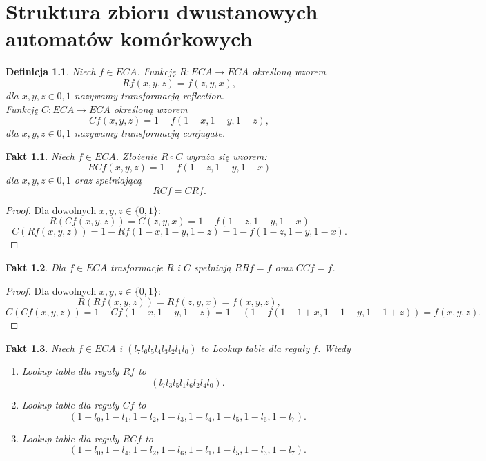 \documentclass{xmgr}
\newtheorem{definition}{Definicja}
\newtheorem{fact}{Fakt}
\begin{document}
\chapter{Struktura zbioru dwustanowych automatów komórkowych}


\begin{definition}
 Niech $f \in ECA$. Funkcję $R : ECA \rightarrow ECA$ określoną wzorem
 \[
  Rf(x,y,z) = f(z,y,x),
 \]
 dla $x,y,z \in {0,1}$ nazywamy transformacją reflection.
 \\Funkcję $C : ECA \rightarrow ECA$ określoną wzorem
 \[
  Cf(x,y,z) = 1 - f(1-x,1-y,1-z),
 \]
 dla $x,y,z \in {0,1}$ nazywamy transformacją conjugate.
\end{definition}

\begin{fact}
 Niech $f \in ECA$. Złożenie $R\circ C$ wyraża się wzorem:
 \[
  RC f (x,y,z) = 1 - f(1-z, 1-y, 1-x)
 \]
dla $x,y,z \in {0,1}$ oraz spełniającą
\[
 RCf = CRf.
\]
\end{fact}

\begin{proof}
 Dla dowolnych $x,y,z \in \{0,1\}$:
 \[
  R(Cf(x,y,z)) = C(z,y,x) = 1 - f(1-z,1-y,1-x)
 \]
\[
 C(Rf(x,y,z)) = 1 - Rf(1-x, 1-y, 1-z) = 1 - f(1-z, 1-y, 1-x).
\]

\end{proof}

\begin{fact}
Dla $f \in ECA$ trasformacje $R$ i $C$ spełniają $RRf = f$ oraz $CCf = f$.
\end{fact}

\begin{proof}
 Dla dowolnych $x,y,z \in \{0,1\}$:
 \[
  R(Rf(x,y,z)) = Rf(z,y,x) = f(x,y,z),
 \]
 \[
  C(Cf(x,y,z)) = 1 - Cf(1-x,1-y,1-z) = 1 - (1 - f(1 - 1+x, 1 - 1+y, 1 - 1+z)) = f(x,y,z).
 \]

\end{proof}


\begin{fact}
 Niech $f \in ECA$ i $(l_{7}l_{6}l_{5}l_{4}l_{3}l_{2}l_{1}l_{0})$ to Lookup table dla reguły $f$. Wtedy
 \begin{enumerate}
  \item Lookup table dla reguły $Rf$ to 
  \[
   (l_{7}l_{3}l_{5}l_{1}l_{6}l_{2}l_{4}l_{0}).
  \]
  \item Lookup table dla reguły $Cf$ to 
  \[
  (1-l_{0}, 1- l_{1}, 1- l_{2}, 1- l_{3}, 1 - l_{4}, 1- l_{5}, 1 - l_{6}, 1 - l_{7}).
  \]
  \item Lookup table dla reguły $RCf$ to 
  \[
   (1-l_{0}, 1- l_{4}, 1- l_{2}, 1- l_{6}, 1 - l_{1}, 1- l_{5}, 1 - l_{3}, 1 - l_{7}).
  \]
 \end{enumerate}
\end{fact}
\end{document}
